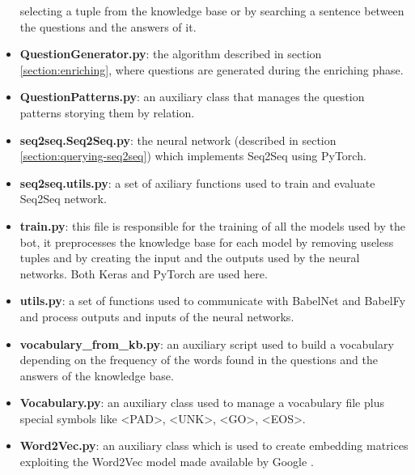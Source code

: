 \documentclass[paper=a4, fontsize=11pt]{scrartcl} %
\numberwithin{equation}{section} %
\numberwithin{figure}{section} %
\numberwithin{table}{section} %
\theoremstyle{definition}
\begin{document}
\begin{itemize}
		selecting a tuple from the knowledge base or by searching a sentence
		between the questions and the answers of it.
	\item \textbf{QuestionGenerator.py}: the algorithm described in section
		\ref{section:enriching}, where questions are generated during the
		enriching phase.
	\item \textbf{QuestionPatterns.py}: an auxiliary class that manages the question
		patterns storying them by relation.
	\item \textbf{seq2seq.Seq2Seq.py}: the neural network (described in section
		 \ref{section:querying-seq2seq}) which implements Seq2Seq using PyTorch.
	\item \textbf{seq2seq.utils.py}: a set of axiliary functions used to train and evaluate
		Seq2Seq network.
	\item \textbf{train.py}: this file is responsible for the training of all the models
		used by the bot, it preprocesses the knowledge base for each model
		by removing useless tuples and by creating the input and the outputs
		used by the neural networks. Both Keras and PyTorch are used here.
	\item \textbf{utils.py}: a set of functions used to communicate with BabelNet and
		BabelFy and process outputs and inputs of the neural networks.
	\item \textbf{vocabulary\_from\_kb.py}: an auxiliary script used to build
		a vocabulary depending on the frequency of the words found in the
		questions and the answers of the knowledge base.
	\item \textbf{Vocabulary.py}: an auxiliary class used to manage a vocabulary
		file plus special symbols like <PAD>, <UNK>, <GO>, <EOS>.
	\item \textbf{Word2Vec.py}: an auxiliary class which is used to create embedding
		matrices exploiting the Word2Vec model made available by
		Google \cite{DBLP:journals/corr/abs-1301-3781}.
\end{itemize}


\newpage



\end{document}
